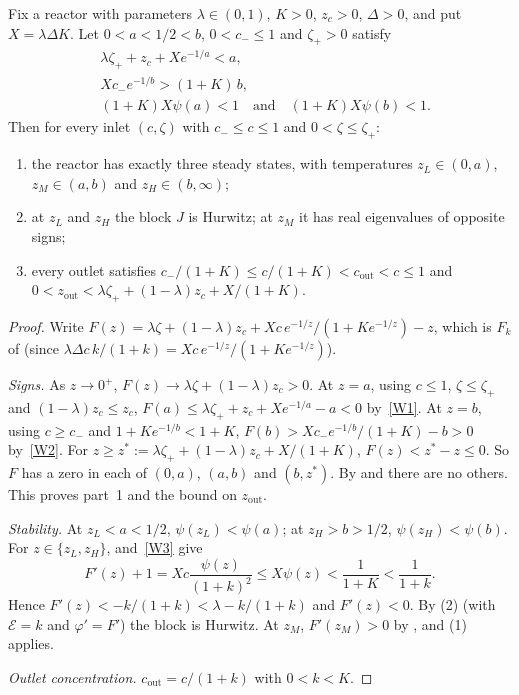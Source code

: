 \documentclass[11pt,a4paper]{report}
\begin{document}
\begin{lemma}[note={window lemma}]\label{lem:window}
Fix a reactor with parameters \(\lambda\in(0,1)\), \(K>0\), \(z_c>0\), \(\Delta>0\), and put \(X=\lambda\Delta K\).
Let \(0<a<1/2<b\), \(0<c_-\le1\) and \(\zeta_+>0\) satisfy
\begin{align}
&\lambda\zeta_++z_c+Xe^{-1/a}<a, \tag{W1}\label{W1}\\
&Xc_-e^{-1/b}>(1+K)\,b, \tag{W2}\label{W2}\\
&(1+K)X\psi(a)<1\quad\text{and}\quad(1+K)X\psi(b)<1. \tag{W3}\label{W3}
\end{align}
Then for every inlet \((c,\zeta)\) with \(c_-\le c\le1\) and \(0<\zeta\le\zeta_+\):
\begin{enumerate}
\item the reactor has exactly three steady states, with temperatures \(z_L\in(0,a)\), \(z_M\in(a,b)\) and
\(z_H\in(b,\infty)\);
\item at \(z_L\) and \(z_H\) the block \(J\) is Hurwitz; at \(z_M\) it has real eigenvalues of opposite signs;
\item every outlet satisfies \(c_-/(1+K)\le c/(1+K)<c_{\mathrm{out}}<c\le1\) and
\(0<z_{\mathrm{out}}<\lambda\zeta_++(1-\lambda)z_c+X/(1+K)\).
\end{enumerate}
\end{lemma}
\begin{proof}
Write \(F(z)=\lambda\zeta+(1-\lambda)z_c+Xc\,e^{-1/z}/(1+Ke^{-1/z})-z\), which is \(F_k\) of 
(since \(\lambda\Delta c\,k/(1+k)=Xc\,e^{-1/z}/(1+Ke^{-1/z})\)).

\emph{Signs.} As \(z\to0^+\), \(F(z)\to\lambda\zeta+(1-\lambda)z_c>0\). At \(z=a\), using \(c\le1\),
\(\zeta\le\zeta_+\) and \((1-\lambda)z_c\le z_c\), \(F(a)\le\lambda\zeta_++z_c+Xe^{-1/a}-a<0\) by~\eqref{W1}. At
\(z=b\), using \(c\ge c_-\) and \(1+Ke^{-1/b}<1+K\), \(F(b)>Xc_-e^{-1/b}/(1+K)-b>0\) by~\eqref{W2}. For
\(z\ge z^*:=\lambda\zeta_++(1-\lambda)z_c+X/(1+K)\), \(F(z)<z^*-z\le0\). So \(F\) has a zero in each of \((0,a)\),
\((a,b)\) and \((b,z^*)\). By  and  there are no others. This proves part~1 and the
bound on \(z_{\mathrm{out}}\).

\emph{Stability.} At \(z_L<a<1/2\), \(\psi(z_L)<\psi(a)\); at \(z_H>b>1/2\), \(\psi(z_H)<\psi(b)\). For
\(z\in\{z_L,z_H\}\),  and~\eqref{W3} give
\[
F'(z)+1=Xc\frac{\psi(z)}{(1+k)^2}\le X\psi(z)<\frac1{1+K}<\frac1{1+k}.
\]
Hence \(F'(z)<-k/(1+k)<\lambda-k/(1+k)\) and \(F'(z)<0\). By (2) (with \(\mathcal E=k\) and
\(\varphi'=F'\)) the block is Hurwitz. At \(z_M\), \(F'(z_M)>0\) by , and (1)
applies.

\emph{Outlet concentration.} \(c_{\mathrm{out}}=c/(1+k)\) with \(0<k<K\).
\end{proof}
\end{document}
